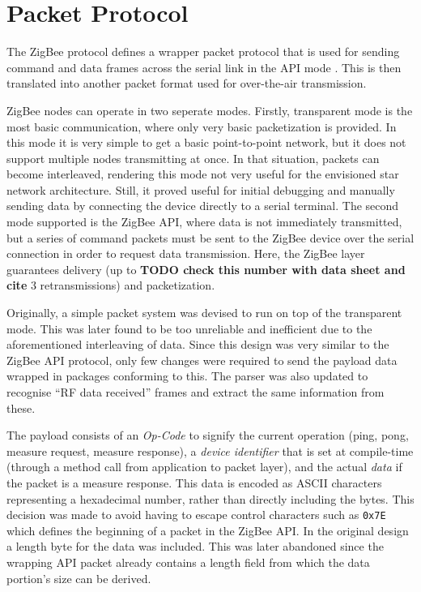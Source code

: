\section{Packet Protocol}
The ZigBee protocol defines a wrapper packet protocol that is used for sending command and data frames across the serial link in the API mode \cite[page 35]{zigbee-datasheet}. This is then translated into another packet format used for over-the-air transmission.

ZigBee nodes can operate in two seperate modes. Firstly, transparent mode is the most basic communication, where only very basic packetization is provided. In this mode it is very simple to get a basic point-to-point network, but it does not support multiple nodes transmitting at once. In that situation, packets can become interleaved, rendering this mode not very useful for the envisioned star network architecture. Still, it proved useful for initial debugging and manually sending data by connecting the device directly to a serial terminal. The second mode supported is the ZigBee API, where data is not immediately transmitted, but a series of command packets must be sent to the ZigBee device over the serial connection in order to request data transmission. Here, the ZigBee layer guarantees delivery (up to \textbf{TODO check this number with data sheet and cite} 3 retransmissions) and packetization.

Originally, a simple packet system was devised to run on top of the transparent mode. This was later found to be too unreliable and inefficient due to the aforementioned interleaving of data. Since this design was very similar to the ZigBee API protocol, only few changes were required to send the payload data wrapped in packages conforming to this. The parser was also updated to recognise ``RF data received'' frames and extract the same information from these.

The payload consists of an \emph{Op-Code} to signify the current operation (ping, pong, measure request, measure response), a \emph{device identifier} that is set at compile-time (through a method call from application to packet layer), and the actual \emph{data} if the packet is a measure response. This data is encoded as ASCII characters representing a hexadecimal number, rather than directly including the bytes. This decision was made to avoid having to escape control characters such as \texttt{0x7E} which defines the beginning of a packet in the ZigBee API. In the original design a length byte for the data was included. This was later abandoned since the wrapping API packet already contains a length field from which the data portion's size can be derived.

